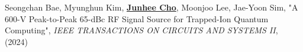 

\begin{cvparagraph}


\bullet \hspace{1 ex} {Seongchan Bae, Myunghun Kim, \textbf{\underline{Junhee Cho}}, Moonjoo Lee, Jae-Yoon Sim, "A 600-V Peak-to-Peak 65-dBc RF Signal Source for Trapped-Ion Quantum Computing", \textit{IEEE TRANSACTIONS ON CIRCUITS AND SYSTEMS II}, (2024)}

\end{cvparagraph}